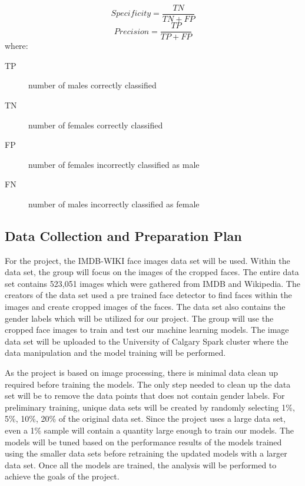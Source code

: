 \documentclass[conference]{IEEEtran}
\begin{document}
\[Specificity = \frac{TN}{TN+FP}\]
\[Precision = \frac{TP}{TP+FP}\]
where:
\begin{description}
\item[TP] number of males correctly classified
\item[TN] number of females correctly classified
\item[FP] number of females incorrectly classified as male
\item[FN] number of males incorrectly classified as female
\end{description}

\subsection{Data Collection and Preparation Plan}
For the project, the IMDB-WIKI face images data set will be used\cite{rothe2015dex}. Within the data set, the group will
focus on the images of the cropped faces. The entire data set contains 523,051 images which were
gathered from IMDB and Wikipedia. The creators of the data set used a pre trained face detector to find
faces within the images and create cropped images of the faces. The data set also contains the gender
labels which will be utilized for our project. The group will use the cropped face images to train and test
our machine learning models. The image data set will be uploaded to the University of Calgary Spark
cluster where the data manipulation and the model training will be performed.

As the project is based on image processing, there is minimal data clean up required before training the
models. The only step needed to clean up the data set will be to remove the data points that does not contain gender labels. For preliminary training, unique data sets will be created by randomly selecting 1\%, 5\%, 10\%, 20\% of the original data set. Since the project uses a large data set, even a 1\% sample will contain a quantity large enough to train our models. The models will be tuned based on the performance results of the models trained using the smaller data sets before retraining the updated models with a larger data set. Once all the models are trained, the analysis will be performed to achieve the goals of the project.
\end{document}
